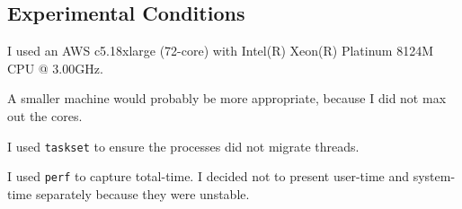 \documentclass[letterpaper,twocolumn,10pt]{article}
\begin{document}


\subsection{Experimental Conditions}\label{appendix:conditions}

I used an AWS c5.18xlarge (72-core) with Intel(R) Xeon(R) Platinum 8124M CPU @ 3.00GHz.

A smaller machine would probably be more appropriate, because I did not max out the cores.

I used \texttt{taskset} to ensure the processes did not migrate threads.

I used \texttt{perf} to capture total-time. I decided not to present user-time and system-time separately because they were unstable.
\end{document}

